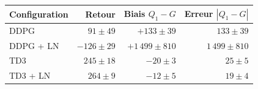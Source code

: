 \begin{tabular}{@{}lrrr@{}}
\toprule
\textbf{Configuration} & \textbf{Retour} & \textbf{Biais $Q_1-G$} & \textbf{Erreur $|Q_1-G|$} \\
\midrule
DDPG & $91 \pm 49$ & $+133 \pm 39$ & $133 \pm 39$ \\
DDPG + LN & $-126 \pm 29$ & $+1\,499 \pm 810$ & $1\,499 \pm 810$ \\
TD3 & $245 \pm 18$ & $-20 \pm 3$ & $25 \pm 5$ \\
TD3 + LN & $264 \pm 9$ & $-12 \pm 5$ & $19 \pm 4$ \\
\bottomrule
\end{tabular}